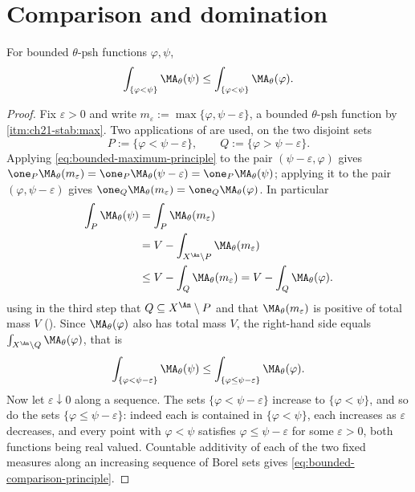 \section{Comparison and domination}
\label{sec:ch25-comparison}

\begin{corollary}
\label{cor:bounded-comparison-principle}
For bounded $\theta$-psh functions $\varphi,\psi$,
\begin{equation}
\label{eq:bounded-comparison-principle}
       \int_{\{\varphi<\psi\}}\MA_\theta(\psi)
       \leq
       \int_{\{\varphi<\psi\}}\MA_\theta(\varphi).
\end{equation}
\end{corollary}

\begin{proof}
Fix $\varepsilon>0$ and write $m_\varepsilon:=\max\{\varphi,
\psi-\varepsilon\}$, a bounded $\theta$-psh function by
\,\cref{itm:ch21-stab:max}.  Two applications of
 are used, on the two disjoint sets
\[
 P:=\{\varphi<\psi-\varepsilon\},\qquad
 Q:=\{\varphi>\psi-\varepsilon\} .
\]
Applying \eqref{eq:bounded-maximum-principle} to the pair
$(\psi-\varepsilon,\varphi)$ gives
$\one_P\MA_\theta(m_\varepsilon)=\one_P\MA_\theta(\psi-\varepsilon)
=\one_P\MA_\theta(\psi)$; applying it to the pair
$(\varphi,\psi-\varepsilon)$ gives
$\one_Q\MA_\theta(m_\varepsilon)=\one_Q\MA_\theta(\varphi)$.  In
particular
\begin{equation}
\label{eq:ch25-comparison-step}
 \begin{aligned}
 \int_P\MA_\theta(\psi)&=\int_P\MA_\theta(m_\varepsilon)\\
 &=V-\int_{X^{\An}\setminus P}\MA_\theta(m_\varepsilon)\\
 &\leq V-\int_Q\MA_\theta(m_\varepsilon)
 =V-\int_Q\MA_\theta(\varphi).
 \end{aligned}
\end{equation}
using in the third step that $Q\subseteq X^{\An}\setminus P$ and that
$\MA_\theta(m_\varepsilon)$ is positive of total mass $V$
().  Since $\MA_\theta(\varphi)$ also has
total mass $V$, the right-hand side equals
$\int_{X^{\An}\setminus Q}\MA_\theta(\varphi)$, that is
\[
 \int_{\{\varphi<\psi-\varepsilon\}}\MA_\theta(\psi)
 \leq\int_{\{\varphi\leq\psi-\varepsilon\}}\MA_\theta(\varphi).
\]
Now let $\varepsilon\downarrow0$ along a sequence.  The sets
$\{\varphi<\psi-\varepsilon\}$ increase to $\{\varphi<\psi\}$, and so do
the sets $\{\varphi\leq\psi-\varepsilon\}$: indeed each is contained in
$\{\varphi<\psi\}$, each increases as $\varepsilon$ decreases, and every
point with $\varphi<\psi$ satisfies $\varphi\leq\psi-\varepsilon$ for
some $\varepsilon>0$, both functions being real valued.  Countable
additivity of each of the two fixed measures along an increasing sequence of
Borel sets gives \eqref{eq:bounded-comparison-principle}.
\end{proof}

